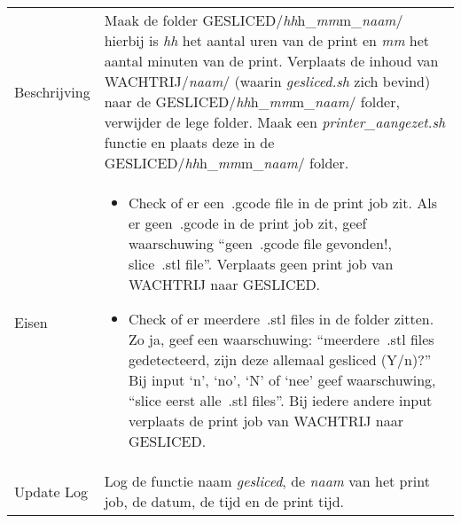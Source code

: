 \documentclass{article}
\newcommand{\quotes}[1]{``#1''}
\begin{document}
\begin{table}[H]
    \centering
    \begin{tabular}%
    {>{\raggedright\arraybackslash}p{}%
    |>{\raggedright\arraybackslash}p{}}
    \rowcolor{myblue} \multicolumn{2}{c}{\rule{0pt}{13pt}Functie: {\Large gesliced.sh}} \\\hline
    Beschrijving & Maak de folder GESLICED/\textit{hh}h\_\textit{mm}m\_\textit{naam}/ hierbij is \textit{hh} het aantal uren van de print en \textit{mm} het aantal minuten van de print. Verplaats de inhoud van WACHTRIJ/\textit{naam}/ (waarin \textit{gesliced.sh} zich bevind) naar de GESLICED/\textit{hh}h\_\textit{mm}m\_\textit{naam}/ folder, verwijder de lege folder. Maak een \textit{printer\_aangezet.sh} functie en plaats deze in de GESLICED/\textit{hh}h\_\textit{mm}m\_\textit{naam}/ folder.\\
    Eisen & 
    \begin{itemize} 
      \item Check of er een~.gcode file in de print job zit. Als er geen~.gcode in de print job zit, geef waarschuwing \quotes{geen~.gcode file gevonden!, slice~.stl file}. Verplaats geen print job van WACHTRIJ naar GESLICED.
\item Check of er meerdere~.stl files in de folder zitten. Zo ja, geef een waarschuwing: \quotes{meerdere~.stl files gedetecteerd, zijn deze allemaal gesliced (Y/n)?} Bij input `n', `no', `N' of `nee' geef waarschuwing, \quotes{slice eerst alle~.stl files}. Bij iedere andere input verplaats de print job van WACHTRIJ naar GESLICED.  
\end{itemize} \\
    Update Log& Log de functie naam \textit{gesliced}, de \textit{naam} van het print job, de datum, de tijd en de print tijd.\\
    \end{tabular}
\end{table}
\end{document}
